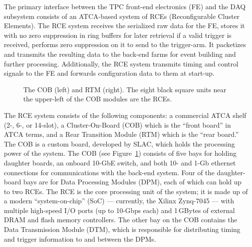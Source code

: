 The primary interface between the TPC front-end electronics (FE) and
the DAQ subsystem consists of an ATCA-based system of RCEs
(Reconfigurable Cluster Elements).  The RCE system receives the
serialized raw data for the FE, stores it with no zero suppression in 
ring buffers for later retrieval if a valid trigger is received, performs 
zero suppression on it to send to the trigger-arm.  It packetizes and 
transmits the resulting data to the back-end
farms for event building and further processing.  Additionally,
the RCE system transmits timing and control signals to the FE %
and forwards configuration data to them at start-up.

\begin{figure}[hbt]
\begin{center}
  \caption[The COB (left) and RTM (right)]{The COB (left) and RTM (right). The eight black square units near the upper-left of the COB modules are the RCEs.}
\end{center}
\label{fig:daq15_cob}
\end{figure}
The RCE system consists of the following components: a commercial ATCA
shelf (2-, 6-, or 14-slot), a Cluster-On-Board (COB) which is the
``front board'' in ATCA terms, and a Rear Transition Module (RTM) which
is the ``rear board.''  The COB is a custom board, developed by SLAC,
which holds the processing power of the system.  The COB (see
Figure~\ref{fig:daq15_cob}) consists of five bays for holding daughter
boards, an onboard 10-GbE switch, and both 10- and 1-Gb ethernet
connections for communications with the back-end system.  Four of the
daughter-board bays are for Data Processing Modules (DPM), each of
which can hold up to two RCEs.  The RCE is the core processing unit of
the system; it is made up of a modern ``system-on-chip'' (SoC) --- currently, the Xilinx
Zynq-7045 --- with multiple high-speed I/O ports (up to 10-Gbps each) and
1\,GBytes of external DRAM and flash memory controllers.  The
other bay on the COB contains the Data Transmission Module (DTM), which
is responsible for distributing timing and trigger information to and
between the DPMs.

